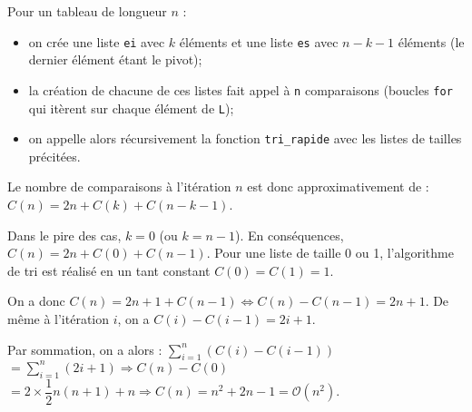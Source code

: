 Pour un tableau de longueur $n$ :
\begin{itemize}
\item on crée une liste \texttt{ei} avec $k$ éléments et une liste \texttt{es} avec $n-k-1$ éléments (le dernier élément étant le pivot);
\item la création de chacune de ces listes fait appel à \texttt{n} comparaisons (boucles \texttt{for} qui itèrent sur chaque élément de \texttt{L});
\item on appelle alors récursivement la fonction \texttt{tri\_rapide} avec les listes de tailles précitées. 
\end{itemize} 
Le nombre de comparaisons à l'itération $n$ est donc approximativement de : 
$C(n)=2n + C(k) + C(n-k-1)$. 

Dans le pire des cas, $k=0$ (ou $k=n-1$). En conséquences,  $C(n)=2n + C(0) + C(n-1)$. Pour une liste de taille 0 ou 1, l'algorithme de tri est réalisé en un tant constant $C(0)=C(1)=1$.  

On a donc $C(n)=2n + 1 + C(n-1) \Leftrightarrow C(n)- C(n-1)=2n + 1 $. De même à l'itération $i$, on a $ C(i)- C(i-1)=2i + 1 $. 


Par sommation, on a alors :
$\sum_{i=1}^n \left(C(i)- C(i-1)\right)$
$=\sum_{i=1}^n \left(2i + 1\right) \Rightarrow C(n)-C(0) $
$= 2 \times \dfrac{1}{2} n (n+1) + n \Rightarrow C(n)=n^2 +2n -1 = \mathcal{O}(n^2)$.






